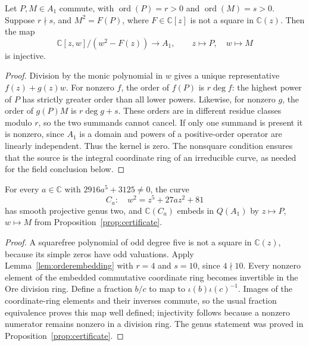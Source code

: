 \begin{lemma}\ours\quad
\label{lem:orderembedding}
Let \(P,M\in A_1\) commute, with \(\operatorname{ord}(P)=r>0\) and \(\operatorname{ord}(M)=s>0\). Suppose \(r\nmid s\), and \(M^2=F(P)\), where \(F\in\mathbb C[z]\) is not a square in \(\mathbb C(z)\). Then the map
\[
 \mathbb C[z,w]/(w^2-F(z))\longrightarrow A_1,
 \qquad z\longmapsto P,\quad w\longmapsto M
\]
is injective.
\end{lemma}
\begin{proof}
Division by the monic polynomial in \(w\) gives a unique representative \(f(z)+g(z)w\). For nonzero \(f\), the order of \(f(P)\) is \(r\deg f\): the highest power of \(P\) has strictly greater order than all lower powers. Likewise, for nonzero \(g\), the order of \(g(P)M\) is \(r\deg g+s\). These orders are in different residue classes modulo \(r\), so the two summands cannot cancel. If only one summand is present it is nonzero, since \(A_1\) is a domain and powers of a positive-order operator are linearly independent. Thus the kernel is zero. The nonsquare condition ensures that the source is the integral coordinate ring of an irreducible curve, as needed for the field conclusion below.
\end{proof}

\begin{corollary}\ours\quad
\label{cor:fieldembedding}
For every \(a\in\mathbb C\) with \(2916a^5+3125\ne0\), the curve
\[
 C_a:\quad w^2=z^5+27az^2+81
\]
has smooth projective genus two, and \(\mathbb C(C_a)\) embeds in \(Q(A_1)\) by \(z\mapsto P\), \(w\mapsto M\) from Proposition~\ref{prop:certificate}.
\end{corollary}
\begin{proof}
A squarefree polynomial of odd degree five is not a square in \(\mathbb C(z)\), because its simple zeros have odd valuations. Apply Lemma~\ref{lem:orderembedding} with \(r=4\) and \(s=10\), since \(4\nmid10\). Every nonzero element of the embedded commutative coordinate ring becomes invertible in the Ore division ring. Define a fraction \(b/c\) to map to \(\iota(b)\iota(c)^{-1}\). Images of the coordinate-ring elements and their inverses commute, so the usual fraction equivalence proves this map well defined; injectivity follows because a nonzero numerator remains nonzero in a division ring. The genus statement was proved in Proposition~\ref{prop:certificate}.
\end{proof}

